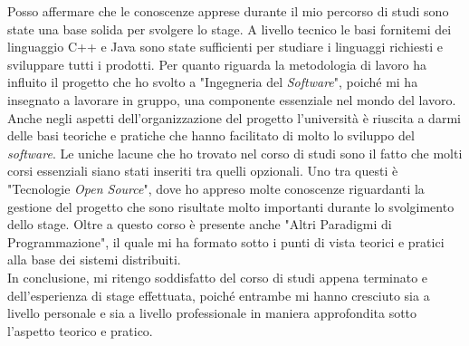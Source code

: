 Posso affermare che le conoscenze apprese durante il mio percorso di studi sono state una base solida per svolgere lo stage. A livello tecnico le basi fornitemi dei linguaggio C++ e Java sono state sufficienti per studiare i linguaggi richiesti e sviluppare tutti i prodotti. Per quanto riguarda la metodologia di lavoro ha influito il progetto che ho svolto a "Ingegneria del \textit{Software}", poiché mi ha insegnato a lavorare in gruppo, una componente essenziale nel mondo del lavoro. Anche negli aspetti dell'organizzazione del progetto l'università è riuscita a darmi delle basi teoriche e pratiche che hanno facilitato di molto lo sviluppo del \textit{software}. Le uniche lacune che ho trovato nel corso di studi sono il fatto che molti corsi essenziali siano stati inseriti tra quelli opzionali. Uno tra questi è "Tecnologie \textit{Open Source}", dove ho appreso molte conoscenze riguardanti la gestione del progetto che sono risultate molto importanti durante lo svolgimento dello stage. Oltre a questo corso è presente anche "Altri Paradigmi di Programmazione", il quale mi ha formato sotto i punti di vista teorici e pratici alla base dei sistemi distribuiti. \\

In conclusione, mi ritengo soddisfatto del corso di studi appena terminato e dell'esperienza di stage effettuata, poiché entrambe mi hanno cresciuto sia a livello personale e sia a livello professionale in maniera approfondita sotto l'aspetto teorico e pratico.

